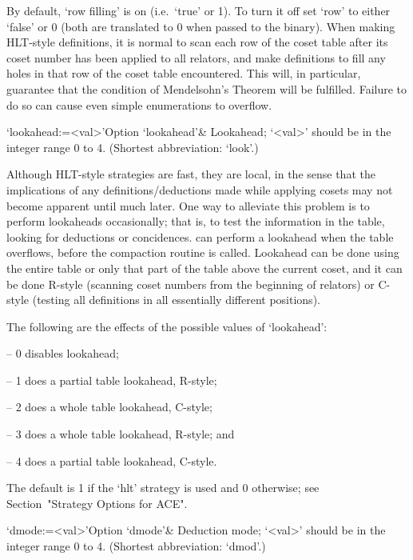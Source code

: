 By default, \lq{}row filling' is on (i.e.~`true' or 1). To turn it off
set `row' to either `false' or 0 (both are translated to 0 when passed
to  the {\ACE}  binary).   When making  HLT-style  definitions, it  is
normal to scan each row of  the coset table after its coset number has
been applied to  all relators, and make definitions  to fill any holes
in that row of the  coset table encountered. This will, in particular,
guarantee  that   the  condition  of  Mendelsohn's   Theorem  will  be
fulfilled.  Failure  to do  so can cause  even simple  enumerations to
overflow.

\>`lookahead:=<val>'{Option `lookahead'}&
Lookahead; `<val>' should be in the integer range 0 to 4.
(Shortest abbreviation: `look'.)
  
Although HLT-style strategies  are fast, they are local,  in the sense
that  the  implications   of  any  definitions/deductions  made  while
applying cosets may not become  apparent until much later.  One way to
alleviate this problem is to perform lookaheads occasionally; that is,
to  test the  information  in  the table,  looking  for deductions  or
concidences.  {\ACE} can perform a lookahead when the table overflows,
before the compaction routine is  called.  Lookahead can be done using
the entire  table or  only that  part of the  table above  the current
coset, and  it can  be done R-style  (scanning coset numbers  from the
beginning  of relators)  or C-style  (testing all  definitions  in all
essentially different positions).

The following are the effects of the possible values of `lookahead':

\beginlist

\item{--} 0 disables lookahead;
\item{--} 1 does a partial table lookahead, R-style; 
\item{--} 2 does a whole table lookahead, C-style; 
\item{--} 3 does a whole table lookahead, R-style; and
\item{--} 4 does a partial table lookahead, C-style.  

\endlist

The default is 1 if the `hlt' strategy is used and  0  otherwise;  see
Section~"Strategy Options for ACE".


\>`dmode:=<val>'{Option `dmode'}&
Deduction mode; `<val>' should be in the integer range 0 to 4.
(Shortest abbreviation: `dmod'.)

